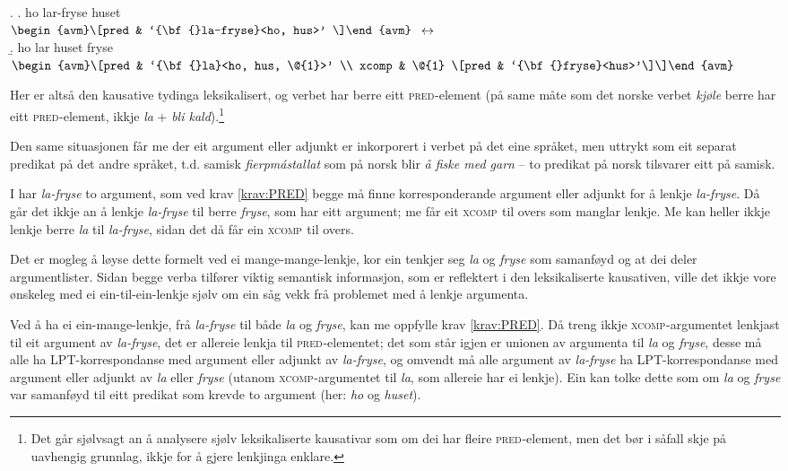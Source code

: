 \documentclass[12pt,a4paper,oneside,draft]{report}
\newcommand{\F}[2]{\textsc{#1}\ensuremath{_{#2}}}
\newcommand{\XCOMP}{\F{xcomp}{}}
\newcommand{\PRED}{\F{pred}{}}
\begin{document}
{\avmoptions{}
\ex. \a. ho lar-fryse huset \\
     $\begin{avm}\[pred & `{\bf{}la-fryse}<ho, hus>' \]\end{avm}$
     $\\\\\leftrightarrow$\\
     \b. ho lar huset fryse \\
     $\begin{avm}\[pred & `{\bf{}la}<ho, hus, \@{1}>' \\
     xcomp & \@{1} \[pred & `{\bf{}fryse}<hus>'\]\]\end{avm}$

}

Her er altså den kausative tydinga leksikalisert, og verbet har berre
eitt \PRED{}-element (på same måte som det norske verbet \emph{kjøle} berre
har eitt \PRED{}-element, ikkje \emph{la} + \emph{bli kald}).\footnote{Det går sjølvsagt an å analysere sjølv leksikaliserte
        kausativar som om dei har fleire \PRED{}-element, men det bør i
        såfall skje på uavhengig grunnlag, ikkje for å gjere lenkjinga
        enklare. }

Den same situasjonen får me der eit argument eller adjunkt er
inkorporert i verbet på det eine språket, men uttrykt som eit separat
predikat på det andre språket, t.d. samisk \emph{fierpmástallat} som på
norsk blir \emph{å fiske med garn} -- to predikat på norsk tilsvarer eitt
på samisk.

I \Last har \emph{la-fryse} to argument, som ved krav \ref{krav:PRED} begge
må finne korresponderande argument eller adjunkt for å lenkje \emph{la-fryse}. 
Då går det ikkje an å lenkje \emph{la-fryse} til berre \emph{fryse},
som har eitt argument; me får eit \XCOMP{} til overs som manglar
lenkje. Me kan heller ikkje lenkje berre \emph{la} til \emph{la-fryse}, sidan
det då får ein \XCOMP{} til overs.

Det er mogleg å løyse dette formelt ved ei mange-mange-lenkje, kor ein
tenkjer seg \emph{la} og \emph{fryse} som samanføyd og at dei deler
argumentlister. Sidan begge verba tilfører viktig semantisk
informasjon, som er reflektert i den leksikaliserte kausativen, ville
det ikkje vore ønskeleg med ei ein-til-ein-lenkje sjølv om ein såg
vekk frå problemet med å lenkje argumenta.

Ved å ha ei ein-mange-lenkje, frå \emph{la-fryse} til både \emph{la} og \emph{fryse},
kan me oppfylle krav \ref{krav:PRED}. Då treng ikkje
\XCOMP{}-argumentet lenkjast til eit argument av \emph{la-fryse}, det er
allereie lenkja til \PRED{}-elementet; det som står igjen er unionen av
argumenta til \emph{la} og \emph{fryse}, desse må alle ha LPT-korrespondanse med
argument eller adjunkt av \emph{la-fryse}, og omvendt må alle argument av \emph{la-fryse} 
ha LPT-korrespondanse med argument eller adjunkt av \emph{la}
eller \emph{fryse} (utanom \XCOMP{}-argumentet til \emph{la}, som allereie har ei
lenkje). Ein kan tolke dette som om \emph{la} og \emph{fryse} var samanføyd til
eitt predikat som krevde to argument (her: \emph{ho} og \emph{huset}).
\end{document}
